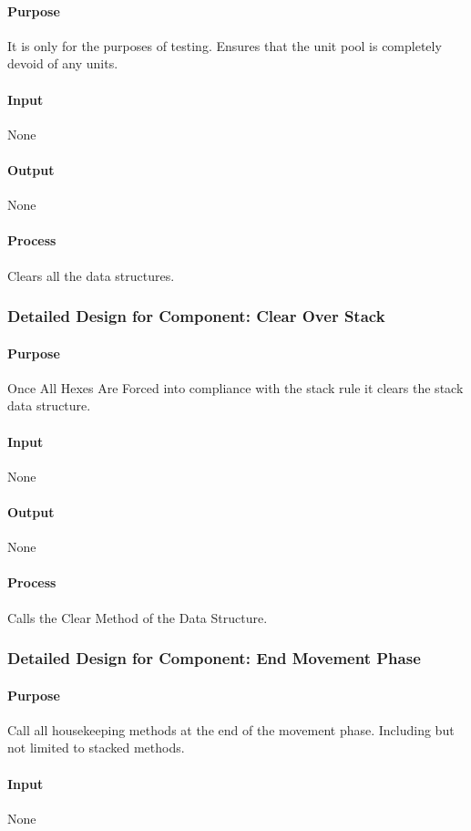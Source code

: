 \documentclass[12pt,a4paper,titlepage]{article}
\begin{document}
\paragraph{Purpose} It is only for the purposes of testing. Ensures that the unit pool is completely devoid of any units.
\paragraph{Input} None
\paragraph{Output} None
\paragraph{Process} Clears all the data structures.

\subsubsection{Detailed Design for Component: Clear Over Stack}
\paragraph{Purpose} Once All Hexes Are Forced into compliance with the stack rule it clears the stack data structure.
\paragraph{Input} None
\paragraph{Output} None
\paragraph{Process} Calls the Clear Method of the Data Structure.

\subsubsection{Detailed Design for Component: End Movement Phase}
\paragraph{Purpose} Call all housekeeping methods at the end of the movement phase.  Including but not limited to stacked methods.
\paragraph{Input} None
\end{document}
